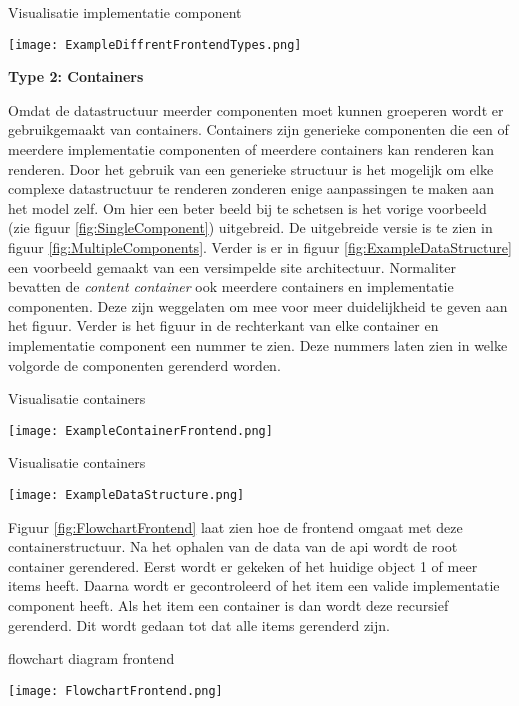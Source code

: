 \begin{graphic}
    \captionsetup{type=figure}
    \caption{Visualisatie implementatie component}
    \texttt{[image: ExampleDiffrentFrontendTypes.png]}
    \label{fig:SingleComponent}
\end{graphic}

\whitespace[2]
\textbf{Type 2: Containers}

\whitespace
Omdat de datastructuur meerder componenten moet kunnen groeperen wordt er gebruikgemaakt van containers.
Containers zijn generieke componenten die een of meerdere implementatie componenten of meerdere containers kan renderen kan renderen.
Door het gebruik van een generieke structuur is het mogelijk om elke complexe datastructuur te renderen zonderen enige aanpassingen te maken aan het model zelf.
%
%
Om hier een beter beeld bij te schetsen is het vorige voorbeeld (zie figuur \ref{fig:SingleComponent}) uitgebreid.
De uitgebreide versie is te zien in figuur \ref{fig:MultipleComponents}.
Verder is er in figuur \ref{fig:ExampleDataStructure} een voorbeeld gemaakt van een versimpelde site architectuur.
Normaliter bevatten de \textit{content container} ook meerdere containers en implementatie componenten.
Deze zijn weggelaten om mee voor meer duidelijkheid te geven aan het figuur.
Verder is het figuur in de rechterkant van elke container en implementatie component een nummer te zien.
Deze nummers laten zien in welke volgorde de componenten gerenderd worden.

\whitespace
\begin{graphic}
    \captionsetup{type=figure}
    \caption{Visualisatie containers}
    \texttt{[image: ExampleContainerFrontend.png]}
    \label{fig:MultipleComponents}
\end{graphic}

\newpage
\whitespace
\begin{graphic}
    \captionsetup{type=figure}
    \caption{Visualisatie containers}
    \texttt{[image: ExampleDataStructure.png]}
    \label{fig:ExampleDataStructure}
\end{graphic}

\whitespace
Figuur \ref{fig:FlowchartFrontend} laat zien hoe de frontend omgaat met deze containerstructuur.
Na het ophalen van de data van de api wordt de root container gerendered.
Eerst wordt er gekeken of het huidige object 1 of meer items heeft.
Daarna wordt er gecontroleerd of het item een valide implementatie component heeft.
Als het item een container is dan wordt deze recursief gerenderd.
Dit wordt gedaan tot dat alle items gerenderd zijn.

\whitespace
\begin{graphic}
    \captionsetup{type=figure}
    \caption{flowchart diagram frontend}
    \texttt{[image: FlowchartFrontend.png]}
    \label{fig:FlowchartFrontend}
\end{graphic}
